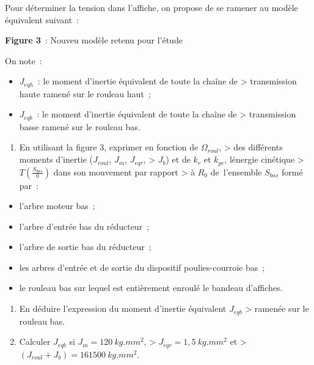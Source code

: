 Pour déterminer la tension dans l'affiche, on propose de se ramener au modèle équivalent suivant~:

\textbf{Figure 3}~: Nouveu modèle retenu pour l'étude

On note~:

\begin{itemize}
\item
  \(J_{eqh}\)~: le moment d'inertie équivalent de toute la chaîne de \textgreater{} transmission haute ramené sur le rouleau haut~;
\item
  \(J_{eqb}\)~: le moment d'inertie équivalent de toute la chaîne de \textgreater{} transmission basse ramené sur le rouleau bas.
\end{itemize}

\begin{enumerate}
\def\labelenumi{\arabic{enumi}.}
\setcounter{enumi}{2}
\tightlist
\item
  En utilisant la figure 3, exprimer en fonction de \(\Omega_{roul}\), \textgreater{} des différents moments d'inertie (\(J_{roul}\), \(J_{m}\), \(J_{eqr}\), \textgreater{} \(J_{b}\)) et de \(k_{r}\) et \(k_{pc}\), l\textquotesingle énergie cinétique \textgreater{} \(T\left( \frac{S_{bas}}{0} \right)\) dans son mouvement par rapport \textgreater{} à \(R_{0}\) de~l'ensemble \(S_{bas}\) formé par~:
\end{enumerate}

\begin{itemize}
\item
  l'arbre moteur bas~;
\item
  l'arbre d'entrée bas du réducteur~;
\item
  l'arbre de sortie bas du réducteur~;
\item
  les arbres d'entrée et de sortie du dispositif poulies-courroie bas~;
\item
  le rouleau bas sur lequel est entièrement enroulé le bandeau d'affiches.
\end{itemize}

\begin{enumerate}
\def\labelenumi{\arabic{enumi}.}
\setcounter{enumi}{3}
\item
  En déduire l'expression du moment d'inertie équivalent \(J_{eqb}\) \textgreater{} ramenée sur le rouleau bas.
\item
  Calculer \(J_{eqb}\) si \(J_{m} = 120\ kg.{mm}^{2}\), \textgreater{} \(J_{eqr} = 1,5\ kg.{mm}^{2}\) et \textgreater{} \(\left( J_{roul} + J_{b} \right) = 161500\ kg.{mm}^{2}\).
\end{enumerate}

